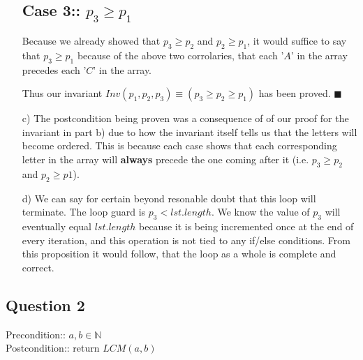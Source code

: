 \documentclass[12pt]{article}
\begin{document}
\begin{itemize}
    \item[]\subsection*{Case 3:: $p_3\geq p_1$}
    Because we already showed that $p_3\geq p_2$ and $p_2\geq p_1$, it would suffice to say that $p_3\geq p_1$ because of the above two corrolaries, that each '$A$' in the array precedes each '$C$' in the array.

    \item[]Thus our invariant $Inv(p_1,p_2,p_3)\equiv (p_3\geq p_2\geq p_1)$ has been proved. $\blacksquare$

    \item[c)] The postcondition being proven was a consequence of of our proof for the invariant in part b) due to how the invariant itself tells us that the letters will become ordered. This is because each case shows that each corresponding letter in the array will \textbf{always} precede the one coming after it (i.e. $p_3\geq p_2$ and $p_2\geq p1$).
    
    \item[d)] We can say for certain beyond resonable doubt that this loop will terminate. The loop guard is $p_3<lst.length$. We know the value of $p_3$ will eventually equal $lst.length$ because it is being incremented once at the end of every iteration, and this operation is not tied to any if/else conditions. From this proposition it would follow, that the loop as a whole is complete and correct.

\end{itemize}

\subsection*{Question 2}
Precondition:: $a,b\in \mathbb{N}$\\
Postcondition:: return $LCM(a,b)$
\end{document}
